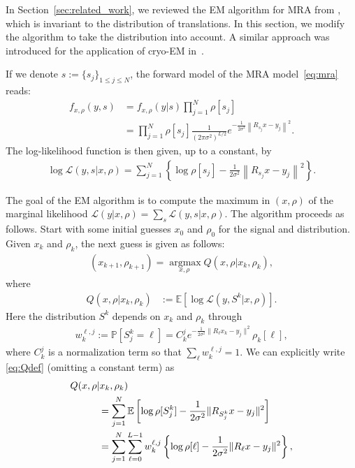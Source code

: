 \documentclass{IEEEtran}
\numberwithin{equation}{section}
\numberwithin{figure}{section}
\theoremstyle{plain}
\theoremstyle{definition}
\theoremstyle{remark}
\theoremstyle{plain}
\theoremstyle{remark}
\theoremstyle{plain}
\theoremstyle{plain}
\theoremstyle{remark}
\newcommand{\E}{\mathbb{E}}
\newcommand{\LL}{{\mathcal{L}}}
\begin{document}
In Section~\ref{sec:related_work}, we reviewed the EM algorithm for MRA from \cite{bendory2017bispectrum}, which is invariant to the distribution of translations. In this section, we modify the algorithm to take the distribution into account. A similar approach was introduced for the application of cryo-EM in~\cite{dvornek2015subspaceem}.
 
If we denote $s:=\{s_j\}_{1\le j\le N}$, the forward model of the MRA model~\eqref{eq:mra} reads:
%
\begin{align*}
%
    f_{x,\rho}(y,s) &= f_{x,\rho}(y|s) \prod_{j=1}^{N} \rho[s_j]\\
    &= \prod_{j=1}^{N} \rho[s_j]\frac{1}{(2 \pi \sigma^2)^{L/2}} 
    e^{- \frac{1}{2\sigma^2}\left\|R_{s_j}x - y_j\right\|^2 }
    .
%
\end{align*}
The log-likelihood function is then given, up to a constant, by
\begin{align*}
%
    \log \LL(y, s | x,\rho) 
    = \sum_{j=1}^N \left\{ \log \rho[s_j] 
                      - \frac{1}{2\sigma^2}\left\|R_{s_j}x - y_j\right\|^2 \right\} .
%
\end{align*}

The goal of the EM algorithm is to compute the maximum in $(x,\rho)$ of the marginal likelihood $\LL(y | x,\rho) = \sum_{s} \LL(y,s | x,\rho)$. The algorithm proceeds as follows. Start with some initial guesses $x_0$ and $\rho_0$ for the signal and distribution. Given $x_k$ and $\rho_k$, the next guess is given as follows:
%
\begin{align*}
%
(x_{k+1},\rho_{k+1}) = \operatorname*{arg\max}_{x,\rho\ } Q(x,\rho | x_k,\rho_{k}),
%
\end{align*}
%
where
\begin{align}
%
Q(x,\rho | x_k,\rho_k) 
&:= \E\left[\log \LL\left(y, S^{k} | x,\rho\right)\right].    \label{eq:Qdef} 
%
%
\end{align}
Here the distribution $S^{k}$ depends on $x_k$ and $\rho_{k}$ through
\begin{align*}
%
w_{k}^{\ell,j} := \mathbb{P}[S^{k}_j = \ell] 
=C_k^{j} e^{-\frac{1}{2\sigma^2}\|R_\ell x_k - y_j\|^2}  \rho_k[\ell], 
%
\end{align*}
where $C_k^{j}$ is a normalization term so that $\sum_{\ell} w_k^{\ell,j} = 1$. We can explicitly write \eqref{eq:Qdef} (omitting a constant term) as
\begin{align*}
Q(x,\rho | x_k,\rho_k) \hspace{-30pt} &\\
&= \sum_{j=1}^N \E\left[ 
\log \rho[S^k_j] - \frac{1}{2\sigma^2}\|R_{S^k_j}x - y_j\|^2\right] 
\\ 
&=\sum_{j=1}^N \sum_{\ell=0}^{L-1} w_{k}^{\ell,j} \left\{
\log \rho[\ell] - \frac{1}{2\sigma^2}\|R_{\ell}x - y_j\|^2  \right\},
\end{align*}
\end{document}
